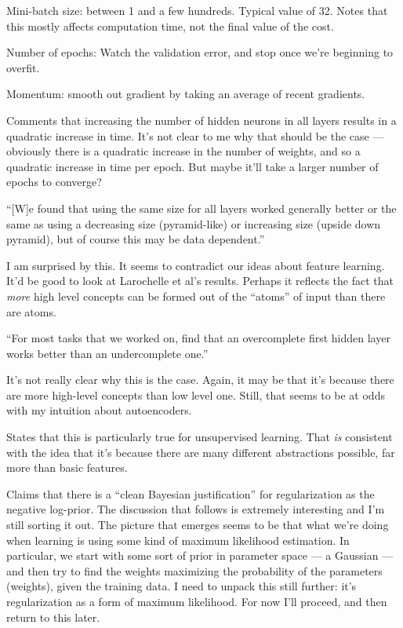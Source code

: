 \documentclass[12pt]{report}
\begin{document}
Mini-batch size: between 1 and a few hundreds.  Typical value of 32.
Notes that this mostly affects computation time, not the final value
of the cost.

Number of epochs: Watch the validation error, and stop once we're
beginning to overfit.

Momentum: smooth out gradient by taking an average of recent
gradients.

Comments that increasing the number of hidden neurons in all layers
results in a quadratic increase in time.  It's not clear to me why
that should be the case --- obviously there is a quadratic increase in
the number of weights, and so a quadratic increase in time per epoch.
But maybe it'll take a larger number of epochs to converge?

``[W]e found that using the same size for all layers worked generally
better or the same as using a decreasing size (pyramid-like) or
increasing size (upside down pyramid), but of course this may be data
dependent.''

I am surprised by this.  It seems to contradict our ideas about
feature learning.  It'd be good to look at Larochelle et al's results.
Perhaps it reflects the fact that \emph{more} high level concepts can
be formed out of the ``atoms'' of input than there are atoms.

``For most tasks that we worked on, find that an overcomplete first
hidden layer works better than an undercomplete one.''

It's not really clear why this is the case.  Again, it may be that
it's because there are more high-level concepts than low level one.
Still, that seems to be at odds with my intuition about autoencoders.

States that this is particularly true for unsupervised learning.  That
\emph{is} consistent with the idea that it's because there are many
different abstractions possible, far more than basic features.

Claims that there is a ``clean Bayesian justification'' for
regularization as the negative log-prior.  The discussion that follows
is extremely interesting and I'm still sorting it out.  The picture
that emerges seems to be that what we're doing when learning is using
some kind of maximum likelihood estimation.  In particular, we start
with some sort of prior in parameter space --- a Gaussian --- and then
try to find the weights maximizing the probability of the parameters
(weights), given the training data.  I need to unpack this still
further: it's regularization as a form of maximum likelihood.  For now
I'll proceed, and then return to this later.
\end{document}
